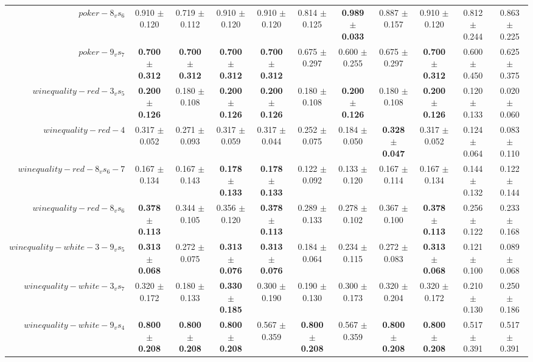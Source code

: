 \begin{table}[!ht]
{\begin{tabular}{r c c c c c c c c c c}
$poker-8_vs_6$ & 0.910 $\pm$ 0.120 & 0.719 $\pm$ 0.112 & 0.910 $\pm$ 0.120 & 0.910 $\pm$ 0.120 & 0.814 $\pm$ 0.125 & \textbf{0.989 $\pm$ 0.033} & 0.887 $\pm$ 0.157 & 0.910 $\pm$ 0.120 & 0.812 $\pm$ 0.244 & 0.863 $\pm$ 0.225 \\
$poker-9_vs_7$ & \textbf{0.700 $\pm$ 0.312} & \textbf{0.700 $\pm$ 0.312} & \textbf{0.700 $\pm$ 0.312} & \textbf{0.700 $\pm$ 0.312} & 0.675 $\pm$ 0.297 & 0.600 $\pm$ 0.255 & 0.675 $\pm$ 0.297 & \textbf{0.700 $\pm$ 0.312} & 0.600 $\pm$ 0.450 & 0.625 $\pm$ 0.375 \\
$winequality-red-3_vs_5$ & \textbf{0.200 $\pm$ 0.126} & 0.180 $\pm$ 0.108 & \textbf{0.200 $\pm$ 0.126} & \textbf{0.200 $\pm$ 0.126} & 0.180 $\pm$ 0.108 & \textbf{0.200 $\pm$ 0.126} & 0.180 $\pm$ 0.108 & \textbf{0.200 $\pm$ 0.126} & 0.120 $\pm$ 0.133 & 0.020 $\pm$ 0.060 \\
$winequality-red-4$ & 0.317 $\pm$ 0.052 & 0.271 $\pm$ 0.093 & 0.317 $\pm$ 0.059 & 0.317 $\pm$ 0.044 & 0.252 $\pm$ 0.075 & 0.184 $\pm$ 0.050 & \textbf{0.328 $\pm$ 0.047} & 0.317 $\pm$ 0.052 & 0.124 $\pm$ 0.064 & 0.083 $\pm$ 0.110 \\
$winequality-red-8_vs_6-7$ & 0.167 $\pm$ 0.134 & 0.167 $\pm$ 0.143 & \textbf{0.178 $\pm$ 0.133} & \textbf{0.178 $\pm$ 0.133} & 0.122 $\pm$ 0.092 & 0.133 $\pm$ 0.120 & 0.167 $\pm$ 0.114 & 0.167 $\pm$ 0.134 & 0.144 $\pm$ 0.132 & 0.122 $\pm$ 0.144 \\
$winequality-red-8_vs_6$ & \textbf{0.378 $\pm$ 0.113} & 0.344 $\pm$ 0.105 & 0.356 $\pm$ 0.120 & \textbf{0.378 $\pm$ 0.113} & 0.289 $\pm$ 0.133 & 0.278 $\pm$ 0.102 & 0.367 $\pm$ 0.100 & \textbf{0.378 $\pm$ 0.113} & 0.256 $\pm$ 0.122 & 0.233 $\pm$ 0.168 \\
$winequality-white-3-9_vs_5$ & \textbf{0.313 $\pm$ 0.068} & 0.272 $\pm$ 0.075 & \textbf{0.313 $\pm$ 0.076} & \textbf{0.313 $\pm$ 0.076} & 0.184 $\pm$ 0.064 & 0.234 $\pm$ 0.115 & 0.272 $\pm$ 0.083 & \textbf{0.313 $\pm$ 0.068} & 0.121 $\pm$ 0.100 & 0.089 $\pm$ 0.068 \\
$winequality-white-3_vs_7$ & 0.320 $\pm$ 0.172 & 0.180 $\pm$ 0.133 & \textbf{0.330 $\pm$ 0.185} & 0.300 $\pm$ 0.190 & 0.190 $\pm$ 0.130 & 0.300 $\pm$ 0.173 & 0.320 $\pm$ 0.204 & 0.320 $\pm$ 0.172 & 0.210 $\pm$ 0.130 & 0.250 $\pm$ 0.186 \\
$winequality-white-9_vs_4$ & \textbf{0.800 $\pm$ 0.208} & \textbf{0.800 $\pm$ 0.208} & \textbf{0.800 $\pm$ 0.208} & 0.567 $\pm$ 0.359 & \textbf{0.800 $\pm$ 0.208} & 0.567 $\pm$ 0.359 & \textbf{0.800 $\pm$ 0.208} & \textbf{0.800 $\pm$ 0.208} & 0.517 $\pm$ 0.391 & 0.517 $\pm$ 0.391 \\

\end{tabular}}
\end{table}

